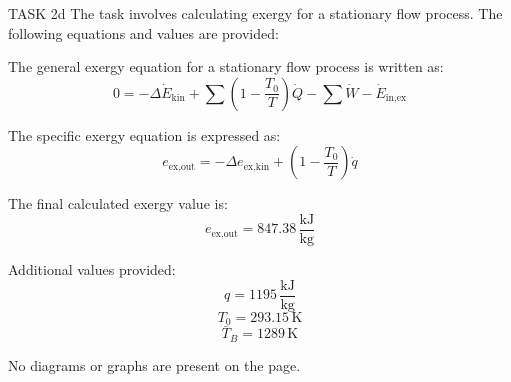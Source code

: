 TASK 2d  
The task involves calculating exergy for a stationary flow process. The following equations and values are provided:

The general exergy equation for a stationary flow process is written as:  
\[
0 = -\Delta \dot{E}_{\text{kin}} + \sum \left( 1 - \frac{T_0}{T} \right) \dot{Q} - \sum \dot{W} - \dot{E}_{\text{in,ex}}
\]

The specific exergy equation is expressed as:  
\[
e_{\text{ex,out}} = -\Delta e_{\text{ex,kin}} + \left( 1 - \frac{T_0}{T} \right) \dot{q}
\]

The final calculated exergy value is:  
\[
e_{\text{ex,out}} = 847.38 \, \frac{\text{kJ}}{\text{kg}}
\]

Additional values provided:  
\[
q = 1195 \, \frac{\text{kJ}}{\text{kg}}
\]  
\[
T_0 = 293.15 \, \text{K}
\]  
\[
\bar{T}_B = 1289 \, \text{K}
\]  

No diagrams or graphs are present on the page.